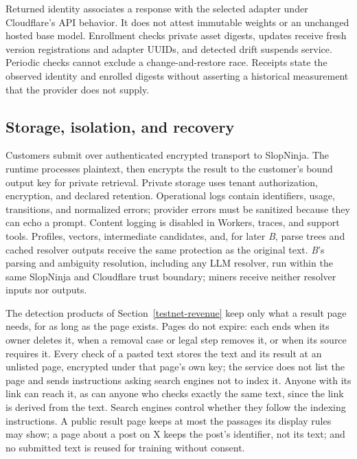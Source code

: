 Returned identity associates a response with the selected adapter under
Cloudflare's API behavior. It does not attest immutable weights or an unchanged
hosted base model. Enrollment checks private asset digests, updates receive
fresh version registrations and adapter UUIDs, and detected drift suspends
service. Periodic checks cannot exclude a change-and-restore race. Receipts state
the observed identity and enrolled digests without asserting a historical
measurement that the provider does not supply.

\subsection{Storage, isolation, and recovery}\label{assignment-recovery-and-the-privacy-boundary}

Customers submit over authenticated encrypted transport to SlopNinja. The
runtime processes plaintext, then encrypts the result to the customer's bound
output key for private retrieval. Private storage uses tenant authorization,
encryption, and declared retention. Operational logs contain identifiers,
usage, transitions, and normalized errors; provider errors must be sanitized
because they can echo a prompt. Content logging is disabled in Workers, traces,
and support tools. Profiles, vectors, intermediate candidates, and, for later
\textit{B}, parse trees and cached resolver outputs receive the same protection
as the original text. \textit{B}'s parsing and ambiguity resolution, including
any LLM resolver, run within the same SlopNinja and Cloudflare trust boundary;
miners receive neither resolver inputs nor outputs.

The detection products of Section~\ref{testnet-revenue} keep only what a
result page needs, for as long as the page exists. Pages do not expire: each
ends when its owner deletes it, when a removal case or legal step removes it,
or when its source requires it. Every check of a pasted text stores the text
and its result at an unlisted page, encrypted under that page's own key; the
service does not list the page and sends instructions asking search engines
not to index it. Anyone with its link can reach it, as can anyone who checks
exactly the same text, since the link is derived from the text. Search engines
control whether they follow the indexing instructions. A public result page
keeps at most the passages its display rules
may show; a page about a post on X keeps the post's identifier, not its text;
and no submitted text is reused for training without consent.


